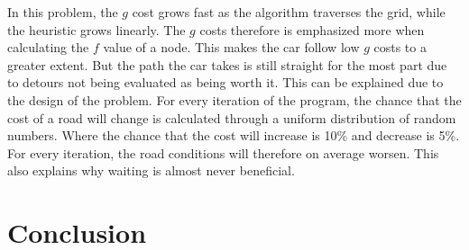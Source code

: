 \documentclass[12pt, a4paper]{article}
\begin{document}
In this problem, the $g$ cost grows fast as the algorithm traverses the grid, while the heuristic grows linearly. The $g$ costs therefore is emphasized more when calculating the $f$ value of a node. This makes the car follow low $g$ costs to a greater extent. But the path the car takes is still straight for the most part due to detours not being evaluated as being worth it. This can be explained due to the design of the problem. For every iteration of the program, the chance that the cost of a road will change is calculated through a uniform distribution of random numbers. Where the chance that the cost will increase is 10\% and decrease is 5\%. For every iteration, the road conditions will therefore on average worsen. This also explains why waiting is almost never beneficial.

\section{Conclusion}
\end{document}
